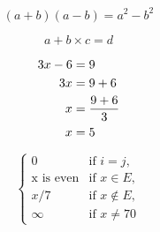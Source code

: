 \documentclass[preview, border=1pt, varwidth]{standalone}
\begin{document}
\begin{equation}
(a+b)(a-b) = a^2 - b^2
\end{equation}

\begin{equation}
a + b \times c = d
\end{equation}

\begin{align}
3x - 6 &= 9 \\
3x &= 9+6 \notag \\
x &= \frac{9+6}{3} \notag \\
x &= 5 \notag
\end{align}

\[
\begin{cases}
0 & \text{if } i = j, \\
\text{x is even} & \text{if } x \in E, \\
x/7 & \text{if } x \notin E, \\
\infty & \text{if } x \neq 70
\end{cases}
\]
\end{document}
